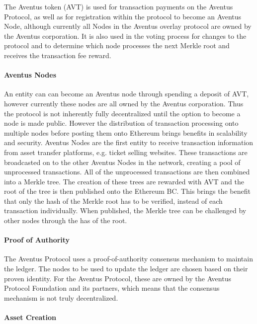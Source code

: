 The Aventus token (AVT) is used for transaction payments on the Aventus Protocol, as well as for registration within the protocol to become an Aventus Node, although currently all Nodes in the Aventus overlay protocol are owned by the Aventus corporation. It is also used in the voting process for changes to the protocol and to determine which node processes the next Merkle root and receives the transaction fee reward.

\paragraph{Aventus Nodes}\label{subsection:aventus nodes}

 An entity can can become an Aventus node through spending a deposit of AVT, however currently these nodes are all owned by the Aventus corporation. Thus the protocol is not inherently fully decentralized until the option to become a node is made public. However the distribution of transaction processing onto multiple nodes before posting them onto Ethereum brings benefits in scalability and security.
 Aventus Nodes are the first entity to receive transaction information from asset transfer platforms, e.g. ticket selling websites. These transactions are broadcasted on to the other Aventus Nodes in the network, creating a pool of unprocessed transactions. All of the unprocessed transactions are then combined into a Merkle tree. The creation of these trees are rewarded with AVT and the root of the tree is then published onto the Ethereum BC. This brings the benefit that only the hash of the Merkle root has to be verified, instead of each transaction individually. When published, the Merkle tree can be challenged by other nodes through the has of the root.

\paragraph{Proof of Authority}

The Aventus Protocol uses a proof-of-authority consensus mechanism to maintain the ledger. The nodes to be used to update the ledger are chosen based on their proven identity. For the Aventus Protocol, these are owned by the Aventus Protocol Foundation and its partners, which means that the consensus mechanism is not truly decentralized. 

\paragraph{Asset Creation}

